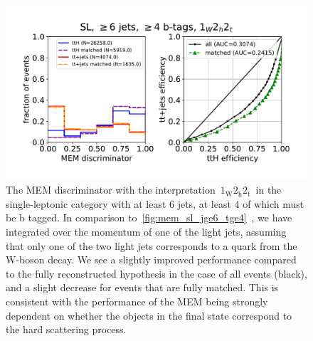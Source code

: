 \begin{figure}
\begin{centering}
\includegraphics[width = 1.0\textwidth]{figures/mem_sl_jge6_tge4_1w2h2t.pdf}
\caption{The MEM discriminator with the interpretation~$1_{\mathrm{W}} 2_{\mathrm{h}} 2_{\mathrm{t}}$~in the single-leptonic category with at least 6 jets, at least 4 of which must be b tagged. In comparison to~\cref{fig:mem_sl_jge6_tge4}~, we have integrated over the momentum of one of the light jets, assuming that only one of the two light jets corresponds to a quark from the~$\mathrm{W}$-boson decay. We see a slightly improved performance compared to the fully reconstructed hypothesis in the case of all events (black), and a slight decrease for events that are fully matched. This is consistent with the performance of the MEM being strongly dependent on whether the objects in the final state correspond to the hard scattering process.}
\label{fig:mem_sl_jge6_tge4_1w2h2t}
\end{centering}
\end{figure}

